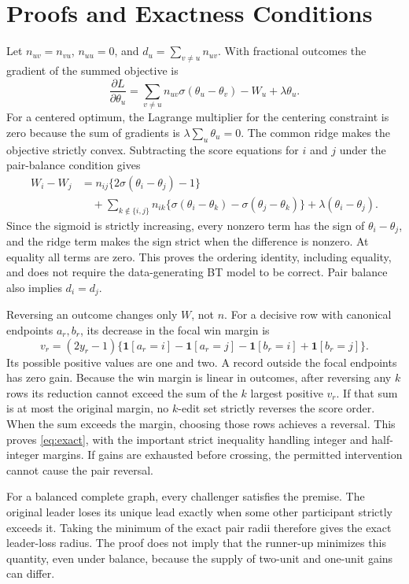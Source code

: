 \documentclass{article}
\newcommand{\sig}{\sigma}
\newcommand{\ind}{\mathbf 1}
\begin{document}
\section{Proofs and Exactness Conditions}\label{app:proof}
Let $n_{uv}=n_{vu}$, $n_{uu}=0$, and $d_u=\sum_{v\ne u}n_{uv}$. With fractional outcomes the gradient of the summed objective is
\[
 \frac{\partial L}{\partial\theta_u}
 =\sum_{v\ne u} n_{uv}\sig(\theta_u-\theta_v)-W_u+\lambda\theta_u.
\]
For a centered optimum, the Lagrange multiplier for the centering constraint is zero because the sum of gradients is $\lambda\sum_u\theta_u=0$. The common ridge makes the objective strictly convex. Subtracting the score equations for $i$ and $j$ under the pair-balance condition gives
\begin{align*}
 W_i-W_j
 &=n_{ij}\{2\sig(\theta_i-\theta_j)-1\}\\
 &\quad+\sum_{k\notin\{i,j\}}n_{ik}\{\sig(\theta_i-\theta_k)-\sig(\theta_j-\theta_k)\}
 +\lambda(\theta_i-\theta_j).
\end{align*}
Since the sigmoid is strictly increasing, every nonzero term has the sign of $\theta_i-\theta_j$, and the ridge term makes the sign strict when the difference is nonzero. At equality all terms are zero. This proves the ordering identity, including equality, and does not require the data-generating BT model to be correct. Pair balance also implies $d_i=d_j$.

Reversing an outcome changes only $W$, not $n$. For a decisive row with canonical endpoints $a_r,b_r$, its decrease in the focal win margin is
\[
 v_r=(2y_r-1)\{\ind[a_r=i]-\ind[a_r=j]-\ind[b_r=i]+\ind[b_r=j]\}.
\]
Its possible positive values are one and two. A record outside the focal endpoints has zero gain. Because the win margin is linear in outcomes, after reversing any $k$ rows its reduction cannot exceed the sum of the $k$ largest positive $v_r$. If that sum is at most the original margin, no $k$-edit set strictly reverses the score order. When the sum exceeds the margin, choosing those rows achieves a reversal. This proves \cref{eq:exact}, with the important strict inequality handling integer and half-integer margins. If gains are exhausted before crossing, the permitted intervention cannot cause the pair reversal.

For a balanced complete graph, every challenger satisfies the premise. The original leader loses its unique lead exactly when some other participant strictly exceeds it. Taking the minimum of the exact pair radii therefore gives the exact leader-loss radius. The proof does not imply that the runner-up minimizes this quantity, even under balance, because the supply of two-unit and one-unit gains can differ.
\end{document}
